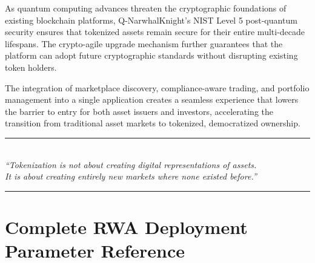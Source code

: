 \documentclass[11pt,a4paper,twoside]{article}
\begin{document}
As quantum computing advances threaten the cryptographic foundations of existing blockchain platforms, Q-NarwhalKnight's NIST Level 5 post-quantum security ensures that tokenized assets remain secure for their entire multi-decade lifespans. The crypto-agile upgrade mechanism further guarantees that the platform can adopt future cryptographic standards without disrupting existing token holders.

The integration of marketplace discovery, compliance-aware trading, and portfolio management into a single application creates a seamless experience that lowers the barrier to entry for both asset issuers and investors, accelerating the transition from traditional asset markets to tokenized, democratized ownership.

\vspace{1cm}

\begin{center}
\rule{0.5\textwidth}{0.4pt}\\[0.5em]
{\small\itshape ``Tokenization is not about creating digital representations of assets.\\
It is about creating entirely new markets where none existed before.''}\\[0.5em]
\rule{0.5\textwidth}{0.4pt}
\end{center}

\appendix

\section{Complete RWA Deployment Parameter Reference}
\label{app:params}
\end{document}
